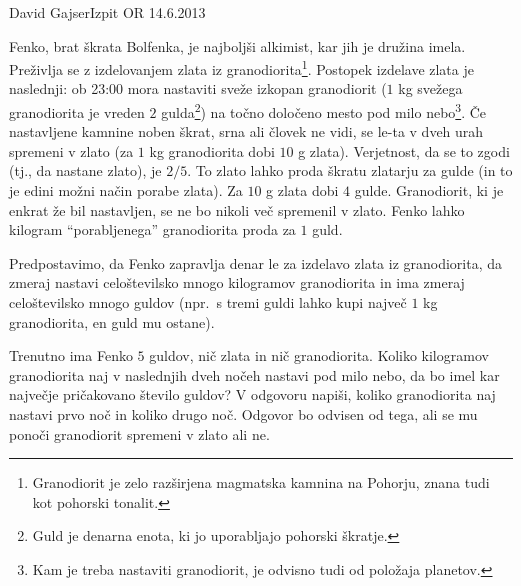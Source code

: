 \begin{naloga}{David Gajser}{Izpit OR 14.6.2013}
\begin{vprasanje}
Fenko, brat škrata Bolfenka, je najboljši alkimist, kar jih je družina imela.
Preživlja se z izdelovanjem zlata iz granodiorita\footnote{
Granodiorit je zelo razširjena magmatska kamnina na Pohorju,
znana tudi kot pohorski tonalit.
}.
Postopek izdelave zlata je naslednji:
ob 23:00 mora nastaviti sveže izkopan granodiorit
($1$ kg svežega granodiorita je vreden $2$ gulda\footnote{
Guld je denarna enota, ki jo uporabljajo pohorski škratje.
})
na točno določeno mesto pod milo nebo\footnote{
Kam je treba nastaviti granodiorit, je odvisno tudi od položaja planetov.
}.
Če nastavljene kamnine noben škrat, srna ali človek ne vidi,
se le-ta v dveh urah spremeni v zlato
(za $1$ kg granodiorita dobi $10$ g zlata).
Verjetnost, da se to zgodi (tj., da nastane zlato), je $2/5$.
To zlato lahko proda škratu zlatarju za gulde
(in to je edini možni način porabe zlata).
Za $10$ g zlata dobi $4$ gulde.
Granodiorit, ki je enkrat že bil nastavljen,
se ne bo nikoli več spremenil v zlato.
Fenko lahko kilogram ``porabljenega'' granodiorita proda za $1$ guld.

Predpostavimo, da Fenko zapravlja denar le za izdelavo zlata iz granodiorita,
da zmeraj nastavi celoštevilsko mnogo kilogramov granodiorita
in ima zmeraj celoštevilsko mnogo guldov
(npr.~s tremi guldi lahko kupi največ $1$ kg granodiorita, en guld mu ostane).

Trenutno ima Fenko $5$ guldov, nič zlata in nič granodiorita.
Koliko kilogramov granodiorita
naj v naslednjih dveh nočeh nastavi pod milo nebo,
da bo imel kar največje pričakovano število guldov?
V odgovoru napiši,
koliko granodiorita naj nastavi prvo noč in koliko drugo noč.
Odgovor bo odvisen od tega,
ali se mu ponoči granodiorit spremeni v zlato ali ne.
\end{vprasanje}
\begin{odgovor}
\end{odgovor}
\end{naloga}

